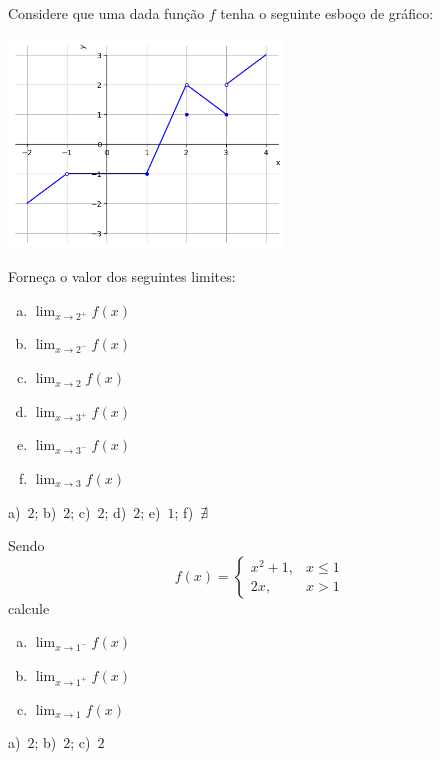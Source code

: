 \cleardoublepage\documentclass[../main.tex]{subfiles}
\begin{document}
\begin{exer}\label{exer:limgraf_lat}
  Considere que uma dada função $f$ tenha o seguinte esboço de gráfico:

  \includegraphics[width=0.55\textwidth]{fig_lim/fig_exer_limgraf}

  Forneça o valor dos seguintes limites:
  \begin{multicols}{3}
  \begin{enumerate}[a)]
  \item $\displaystyle \lim_{x\to 2^+} f(x)$
  \item $\displaystyle \lim_{x\to 2^-} f(x)$
  \item $\displaystyle \lim_{x\to 2} f(x)$
  \item $\displaystyle \lim_{x\to 3^+} f(x)$
  \item $\displaystyle \lim_{x\to 3^-} f(x)$
  \item $\displaystyle \lim_{x\to 3} f(x)$
  \end{enumerate}
  \end{multicols}
\end{exer}
\begin{resp}
  a)~$2$; b)~$2$; c)~$2$; d)~$2$; e)~$1$; f)~$\nexists$
\end{resp}

\begin{exer}
  Sendo
  \begin{equation*}
    f(x) = \left\{
      \begin{array}{ll}
        x^2+1, & x\leq 1\\
        2x, & x>1
      \end{array}
    \right.
  \end{equation*}
  calcule
  \begin{multicols}{3}
  \begin{enumerate}[a)]
  \item $\displaystyle \lim_{x\to 1^-} f(x)$
  \item $\displaystyle \lim_{x\to 1^+} f(x)$
  \item $\displaystyle \lim_{x\to 1} f(x)$
  \end{enumerate}\end{multicols}
\end{exer}
\begin{resp}
  a)~$2$; b)~$2$; c)~$2$
\end{resp}
\end{document}
